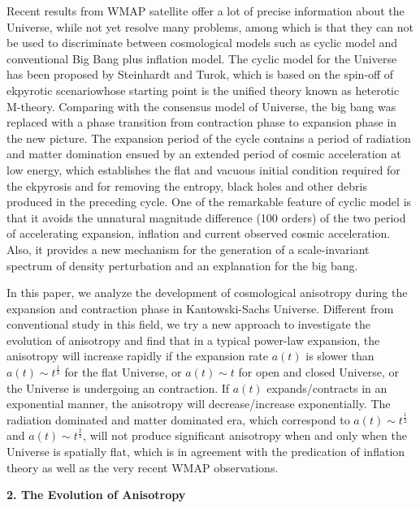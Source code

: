 \documentclass[a4paper,preprint]{revtex4}
\begin{document}
Recent results from WMAP satellite offer a lot of precise
information about the Universe\cite{wmap}, while not yet resolve
many problems, among which is that they can not be used to
discriminate between cosmological models such as cyclic model and
conventional Big Bang plus inflation model\cite{stscience}. The
cyclic model for the Universe has been proposed by Steinhardt and
Turok\cite{steinhardt1}, which is based on the spin-off of
ekpyrotic scenario\cite{steinhardt2}whose starting point is the
unified theory known as heterotic M-theory\cite{witten}. Comparing
with the consensus model of Universe, the big bang was replaced
with a phase transition from contraction phase to expansion phase
in the new picture. The expansion period of the cycle contains a
period of radiation and matter domination ensued by an extended
period of cosmic acceleration at low energy, which establishes the
flat and vacuous initial condition required for the ekpyrosis and
for removing the entropy, black holes and other debris produced in
the preceding cycle. One of the remarkable feature of cyclic model
is that it avoids the unnatural magnitude difference (100 orders)
of the two period of accelerating expansion, inflation and current
observed cosmic acceleration. Also, it provides a new mechanism
for the generation of a scale-invariant spectrum of density
perturbation and an explanation for the big bang.

In this paper, we analyze the development of cosmological
anisotropy during the expansion and contraction phase in
Kantowski-Sachs Universe. Different from conventional study in
this field\cite{kantowski}, we try a new approach to investigate
the evolution of anisotropy and find that in a typical power-law
expansion, the anisotropy will increase rapidly if the expansion
rate $a(t)$ is slower than $a(t)\sim t^{\frac{1}{3}}$ for the flat
Universe, or $a(t)\sim t$ for open and closed Universe, or the
Universe is undergoing an contraction. If $a(t)$ expands/contracts
in an exponential manner, the anisotropy will decrease/increase
exponentially. The radiation dominated and matter dominated era,
which correspond to $a(t)\sim t^{\frac{1}{2}}$ and $a(t)\sim
t^{\frac{2}{3}}$, will not produce significant anisotropy when and
only when the Universe is spatially flat, which is in agreement
with the predication of inflation theory\cite{inflation} as well
as the very recent WMAP observations\cite{stscience}.




\vspace{0.4cm} \noindent\textbf{2. The Evolution of Anisotropy}
 \vspace{0.4cm}
\end{document}
